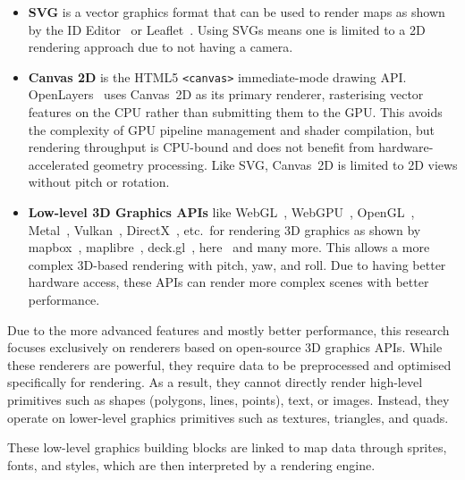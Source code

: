 \begin{itemize}
\item \begin{sloppypar}\textbf{SVG} is a vector graphics format that can be used to render maps as shown by the ID Editor~\cite{OpenstreetmapID2026} or Leaflet~\cite{LeafletOpensourceJavaScript}.
Using SVGs means one is limited to a 2D rendering approach due to not having a camera.\end{sloppypar}

\item \textbf{Canvas 2D} is the HTML5 \texttt{<canvas>} immediate-mode drawing API.
OpenLayers~\cite{OpenLayersWelcome} uses Canvas~2D as its primary renderer, rasterising vector features on the CPU rather than submitting them to the GPU.
This avoids the complexity of GPU pipeline management and shader compilation, but rendering throughput is CPU-bound and does not benefit from hardware-accelerated geometry processing.
Like SVG, Canvas~2D is limited to 2D views without pitch or rotation.

\item \begin{sloppypar}\textbf{Low-level 3D Graphics APIs} like WebGL~\cite{Getwebglorg}, WebGPU~\cite{WebGPU}, OpenGL~\cite{OpenGL4Reference}, Metal~\cite{incMetalOverview}, Vulkan~\cite{HomeVulkanCross}, DirectX~\cite{DirectXSpecs}, etc.\ for rendering 3D graphics as shown by mapbox~\cite{MapboxMapsNavigation}, maplibre~\cite{maplibreMapLibre}, deck.gl~\cite{HomeDeckgl}, here~\cite{HERETechnologiesWorlds} and many more.
This allows a more complex 3D-based rendering with pitch, yaw, and roll.
Due to having better hardware access, these APIs can render more complex scenes with better performance.\end{sloppypar}
\end{itemize}

Due to the more advanced features and mostly better performance, this research focuses exclusively on renderers based on open-source 3D graphics APIs.
While these renderers are powerful, they require data to be preprocessed and optimised specifically for rendering.
As a result, they cannot directly render high-level primitives such as shapes (polygons, lines, points), text, or images.
Instead, they operate on lower-level graphics primitives such as textures, triangles, and quads.

These low-level graphics building blocks are linked to map data through sprites, fonts, and styles, which are then interpreted by a rendering engine.

